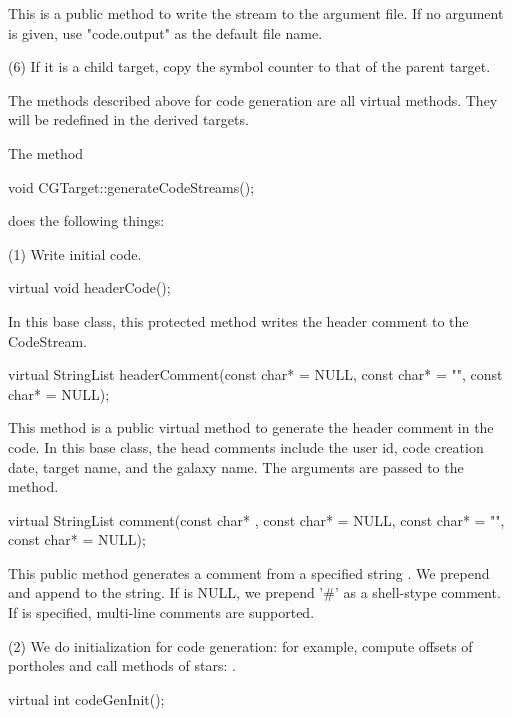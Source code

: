 This is a public method to write the  stream to the argument
file. If no argument is given, use "code.output" as the default file
name.

(6) If it is a child target, copy the symbol counter to that of
the parent target.

The methods described above for code generation are all virtual
methods.  They will be redefined in the derived targets.

The method 
   
\begin{example}
void CGTarget::generateCodeStreams();
\end{example}
   
does the following things:

(1) Write initial code.

\begin{example}
virtual void headerCode();
\end{example}

In this base class, this protected method writes the  header comment
to the  CodeStream.

\begin{example}
virtual StringList headerComment(const char*  = NULL, const char*
 = "", const char*  = NULL);
\end{example}

This method is a public virtual method to generate the header
comment in the code. In this base class, the head comments include the
user id, code creation date, target name, and the galaxy name. The
arguments are passed to the  method.

\begin{example}
virtual StringList comment(const char* , const char*  = 
NULL, const char*  = "", const char*  = NULL);
\end{example}

This public method generates a comment from a specified string .
We prepend  and append  to the string. If 
is NULL, we prepend '#' as a shell-stype comment. If  is 
specified, multi-line comments are supported.

(2) We do initialization for code generation: for example, compute
offsets of portholes and call  methods of stars:
.

\begin{example}
virtual int codeGenInit();
\end{example}

